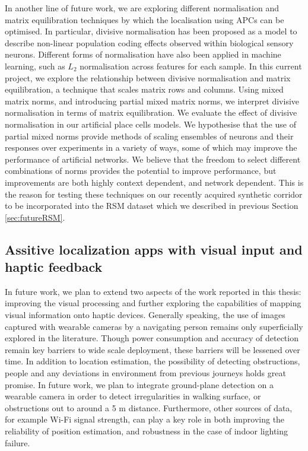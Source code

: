 In another line of future work, we are exploring different normalisation and matrix equilibration techniques by which the localisation using APCs can be optimised. In particular, divisive normalisation has been proposed as a model to describe non-linear population coding effects observed within biological sensory neurons. Different forms of normalisation have also been applied in machine learning, such as $L_2$ normalisation across features for each sample. In this current project, we explore the relationship between divisive normalisation and matrix equilibration, a technique that scales matrix rows and columns. Using mixed matrix norms, and introducing partial mixed matrix norms, we interpret divisive normalisation in terms of matrix equilibration. We evaluate the effect of divisive normalisation in our artificial place cells models. We hypothesise that the use of partial mixed norms provide methods of scaling ensembles of neurons and their responses over experiments in a variety of ways, some of which may improve the performance of artificial networks. We believe that the freedom to select different combinations of norms provides the potential to improve performance, but improvements are both highly context dependent, and network dependent. This is the reason for testing these techniques on our recently acquired synthetic corridor to be incorporated into the RSM dataset which we described in previous Section \ref{sec:futureRSM}.

\subsection{Assitive localization apps with visual input and haptic feedback}

In future work, we plan to extend two aspects of the work reported in this thesis: improving the visual processing and further exploring the capabilities of mapping visual information onto haptic devices. Generally speaking, the use of images captured with wearable cameras by a navigating person remains only superficially explored in the literature. Though power consumption and accuracy of detection remain key barriers to wide scale deployment, these barriers will be lessened over time. In addition to location estimation, the possibility of detecting obstructions, people and any deviations in environment from previous journeys holds great promise. In future work, we plan to integrate ground-plane detection on a wearable camera in order to detect irregularities in walking surface, or obstructions out to around a 5 m distance. Furthermore, other sources of data, for example Wi-Fi signal strength, can play a key role in both improving the reliability of position estimation, and robustness in the case of indoor lighting failure.

